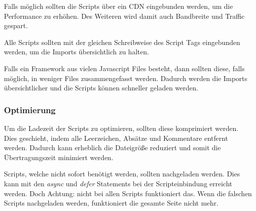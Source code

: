Falls möglich sollten die Scripts über ein CDN eingebunden werden, um die Performance zu erhöhen. Des Weiteren wird damit auch Bandbreite und Traffic gespart. 

Alle Scripts sollten mit der gleichen Schreibweise des Script Tags eingebunden werden, um die Imports übersichtlich zu halten. 

Falls ein Framework aus vielen Javascript Files besteht, dann sollten diese, falls möglich, in weniger Files zusammengefasst werden. Dadurch werden die Imports übersichtlicher und die Scripts können schneller geladen werden.

\subsubsection{Optimierung}
Um die Ladezeit der Scripts zu optimieren, sollten diese komprimiert werden. Dies geschieht, indem alle Leerzeichen, Absätze und Kommentare entfernt werden. Dadurch kann erheblich die Dateigröße reduziert und somit die Übertragungszeit minimiert werden. 

Scripts, welche nicht sofort benötigt werden, sollten nachgeladen werden. Dies kann mit den \textit{async} und \textit{defer} Statements bei der Scripteinbindung erreicht werden. Doch Achtung: nicht bei allen Scripts funktioniert das. Wenn die falschen Scripts nachgeladen werden, funktioniert die gesamte Seite nicht mehr.